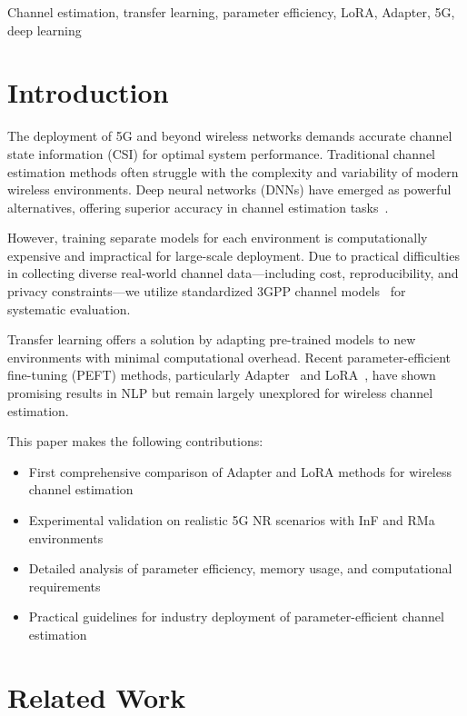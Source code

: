 \documentclass[conference]{IEEEtran}
\begin{document}
\begin{IEEEkeywords}
Channel estimation, transfer learning, parameter efficiency, LoRA, Adapter, 5G, deep learning
\end{IEEEkeywords}

\section{Introduction}

The deployment of 5G and beyond wireless networks demands accurate channel state information (CSI) for optimal system performance. Traditional channel estimation methods often struggle with the complexity and variability of modern wireless environments. Deep neural networks (DNNs) have emerged as powerful alternatives, offering superior accuracy in channel estimation tasks~\cite{ye2018power}.

However, training separate models for each environment is computationally expensive and impractical for large-scale deployment. Due to practical difficulties in collecting diverse real-world channel data—including cost, reproducibility, and privacy constraints—we utilize standardized 3GPP channel models~\cite{3gpp38901} for systematic evaluation.

Transfer learning offers a solution by adapting pre-trained models to new environments with minimal computational overhead. Recent parameter-efficient fine-tuning (PEFT) methods, particularly Adapter~\cite{houlsby2019parameter} and LoRA~\cite{hu2021lora}, have shown promising results in NLP but remain largely unexplored for wireless channel estimation.

This paper makes the following contributions:
\begin{itemize}
\item First comprehensive comparison of Adapter and LoRA methods for wireless channel estimation
\item Experimental validation on realistic 5G NR scenarios with InF and RMa environments
\item Detailed analysis of parameter efficiency, memory usage, and computational requirements
\item Practical guidelines for industry deployment of parameter-efficient channel estimation
\end{itemize}

\section{Related Work}
\end{document}
